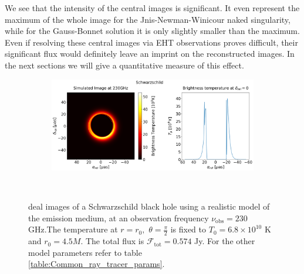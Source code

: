 \documentclass[12pt]{article}
\numberwithin{equation}{section}
\numberwithin{figure}{section}
\begin{document}
	We see that the intensity of the central images is significant. It even represent the maximum of the whole image for the Jnis-Newman-Winicour naked singularity, while for the Gauss-Bonnet solution it is only slightly smaller than the maximum. Even if resolving these central images via EHT observations proves difficult, their significant flux would definitely leave an imprint on the reconstructed images. In the next sections we will give a quantitative measure of this effect.
	
	\newpage
	
	\begin{figure}[h!]
		\centering
		\begin{subfigure}{12cm}
			\hspace{-0cm}
			\includegraphics[scale = 0.25]{Section_8_Observing_Horizonless_Objects/Ray_tracer_plot_230_Sch.png}
		\end{subfigure}\\
		\label{Kerr_Ray_tracer_230}
		\caption[Ideal images of a Schwarzschild black hole using a realistic model of the emission medium, at an observation frequency $\nu_\text{obs} = 230$ GHz.]{\small deal images of a Schwarzschild black hole using a realistic model of the emission medium, at an observation frequency $\nu_\text{obs} = 230$ GHz.The temperature at $r = r_0,\,\,\theta = \frac{\pi}{2}$ is fixed to $T_0 = 6.8\times10^{10}$ K and $r_0 = 4.5M$. The total flux is $\mathcal{F}_{\text{tot}} = 0.574$ Jy. For the other model parameters refer to table \ref{table:Common_ray_tracer_params}.} 
	\end{figure}
	
\end{document}
